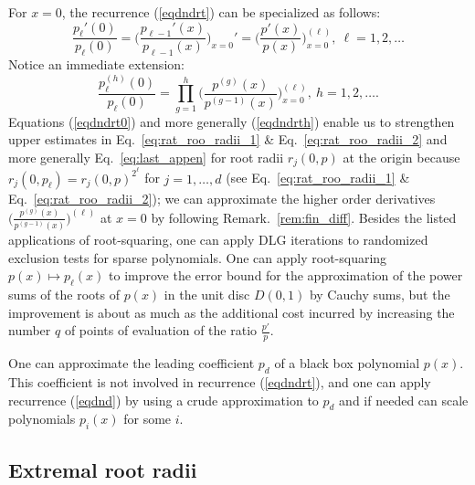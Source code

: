 \documentclass[runningheads]{llncs}
\begin{document}

For $x=0$, the recurrence (\ref{eqdndrt}) can be specialized as follows:
 \begin{equation}\label{eqdndrt0} \frac{p_{{\ell}}'(0)}{p_{\ell}(0)}=\Bigg(\frac{p_{\ell-1}'(x)}{p_{\ell-1}(x)}\Bigg)_{x=0}'=\Bigg(\frac{p'(x)}{p(x)}\Bigg)_{x=0}^{(\ell)},~\ell=1,2,\dots
\end{equation}
Notice an immediate extension:
\begin{equation}\label{eqdndrth} \frac{p_{{\ell}}^{(h)}(0)}{p_{\ell}(0)}=\prod_{g=1}^h\Bigg(\frac{p^{(g)}(x)}{p^{(g-1)}(x)}\Bigg)_{x=0}^{(\ell)},~h=1,2,\dots.
\end{equation}
Equations (\ref{eqdndrt0}) and more generally (\ref{eqdndrth})
enable us to  strengthen
upper estimates in Eq.~\ref{eq:rat_roo_radii_1} \& Eq.~\ref{eq:rat_roo_radii_2}
and more generally Eq.~\ref{eq:last_appen} for root radii $r_j(0,p)$   at the origin  because $r_j(0,p_{\ell})=r_j(0,p)^{2^{\ell}}$ for $j=1,\dots,d$ (see  Eq.~\ref{eq:rat_roo_radii_1} \& Eq.~\ref{eq:rat_roo_radii_2}); we can  approximate the higher order derivatives
$\Big(\frac{p^{(g)}(x)}{p^{(g-1)}(x)}\Big)^{(\ell)}$
 at $x=0$ by following Remark.~\ref{rem:fin_diff}.
Besides the listed applications of
root-squaring, one can apply DLG iterations to randomized exclusion tests for sparse polynomials.
One can apply root-squaring $p(x)\mapsto p_{\ell}(x)$ to improve  the error bound for the approximation of the power sums of the roots of  $p(x)$ in the unit disc $D(0,1)$ by Cauchy sums, but the improvement is about as much as the additional cost incurred by increasing the number $q$ of points of evaluation of the ratio $\frac{p'}{p}$.
\begin{remark}\label{rescdnd}
 One can approximate the leading coefficient $p_d$  of a black box polynomial $p(x)$. This coefficient is not involved in recurrence (\ref{eqdndrt}),
 and one can apply  recurrence (\ref{eqdnd}) by using a crude
 approximation to  $p_d$
 and if needed can scale polynomials
 $p_i(x)$ for some $i$.
\end{remark}

\subsection{Extremal root radii}\label{sec:ext_root_rad}
\end{document}

